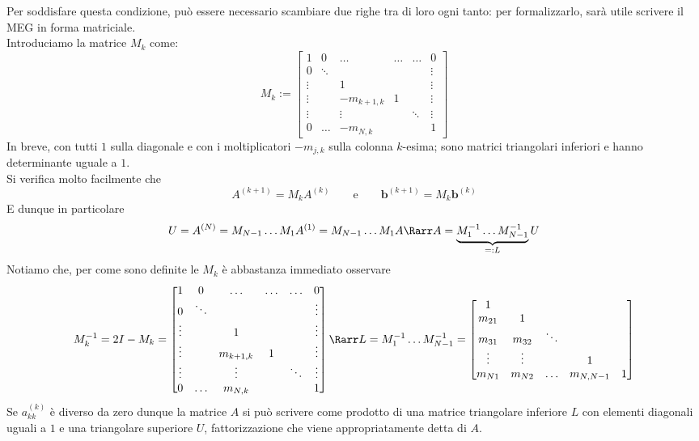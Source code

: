 \documentclass[openany]{book}
\begin{document}
Per soddisfare questa condizione, può essere necessario scambiare due righe tra di loro ogni tanto: per formalizzarlo, sarà utile scrivere il MEG in forma matriciale.\\
Introduciamo la matrice $M_k$ come:
\[M_k := \begin{bmatrix}
1 & 0 & \dots & \dots & \dots & 0 \\
0 & \ddots &  &  &  & \vdots \\
\vdots &  & 1 & &  & \vdots \\
\vdots &  & -m_{k+1,k} & 1 &  & \vdots \\
\vdots &  & \vdots &  & \ddots & \vdots \\
0 & \dots & -m_{N,k} &  &  & 1
\end{bmatrix} \]
In breve, con tutti $1$ sulla diagonale e con i moltiplicatori $-m_{j,k}$ sulla colonna $k$-esima; sono matrici triangolari inferiori e hanno determinante uguale a $1$.\\
Si verifica molto facilmente che 
\[ A^{(k+1)} = M_k A^{(k)}\qquad\text{e}\qquad \mathbf b^{(k+1)}=M_k \mathbf b^{(k)} \]
E dunque in particolare 
\[ U = A^{(N)} = M_{N-1}\dots M_1 A^{(1)} = M_{N-1}\dots M_1 A \Rarr A = \underbrace{M_1^{-1}\dots M_{N-1}^{-1}}_{=: L} U \]
Notiamo che, per come sono definite le $M_k$ è abbastanza immediato osservare 
\[ M_k^{-1} = 2I-M_{k} = \begin{bmatrix}
1 & 0 & \dots & \dots & \dots & 0 \\
0 & \ddots &  &  &  & \vdots \\
\vdots &  & 1 & &  & \vdots \\
\vdots &  & m_{k+1,k} & 1 &  & \vdots \\
\vdots &  & \vdots &  & \ddots & \vdots \\
0 & \dots & m_{N,k} &  &  & 1
\end{bmatrix} \Rarr L = M_1^{-1}\dots M_{N-1}^{-1} = \begin{bmatrix}
1 &  &  &  &  \\
m_{21} & 1 &  &  &  \\
m_{31} & m_{32} & \ddots &  &  \\
\vdots & \vdots &  & 1 &  \\
m_{N1} & m_{N2} & \dots & m_{N,N-1} & 1
\end{bmatrix} \]
Se $a_{kk}^{(k)}$ è diverso da zero dunque la matrice $A$ si può scrivere come prodotto di una matrice triangolare inferiore $L$ con elementi diagonali uguali a $1$ e una triangolare superiore $U$, fattorizzazione che viene appropriatamente detta  di $A$.\\
\end{document}
